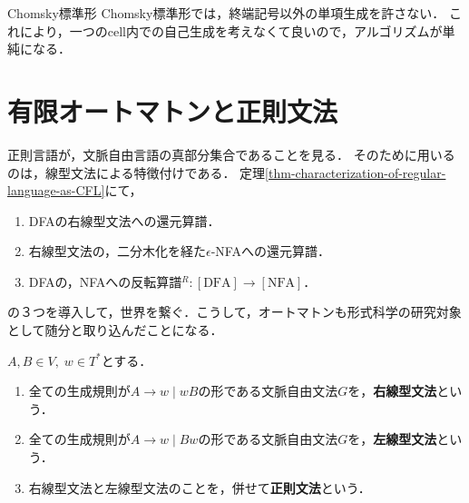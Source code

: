 \documentclass[uplatex, dvipdfmx]{jsreport}
\begin{document}
\begin{itembox}[l]{Chomsky標準形}
    Chomsky標準形では，終端記号以外の単項生成を許さない．
    これにより，一つのcell内での自己生成を考えなくて良いので，アルゴリズムが単純になる．
\end{itembox}

\section{有限オートマトンと正則文法}

\begin{tcolorbox}[colframe=ForestGreen, colback=ForestGreen!10!white, breakable]
    正則言語が，文脈自由言語の真部分集合であることを見る．
    そのために用いるのは，線型文法による特徴付けである．
    定理\ref{thm-characterization-of-regular-language-as-CFL}にて，
    \begin{enumerate}
        \item DFAの右線型文法への還元算譜．
        \item 右線型文法の，二分木化を経た$\epsilon$-NFAへの還元算譜．
        \item DFAの，NFAへの反転算譜${}^R:[\mathrm{DFA}]\to[\mathrm{NFA}]$．
    \end{enumerate}
    の３つを導入して，世界を繋ぐ．こうして，オートマトンも形式科学の研究対象として随分と取り込んだことになる．
\end{tcolorbox}

\begin{definition}\label{def-regular-grammar}
    $A,B\in V,\;w\in T^*$とする．
    \begin{enumerate}
        \item 全ての生成規則が$A\to w\mid wB$の形である文脈自由文法$G$を，\textbf{右線型文法}という．
        \item 全ての生成規則が$A\to w\mid Bw$の形である文脈自由文法$G$を，\textbf{左線型文法}という．
        \item 右線型文法と左線型文法のことを，併せて\textbf{正則文法}という．
    \end{enumerate}
\end{definition}
\end{document}
